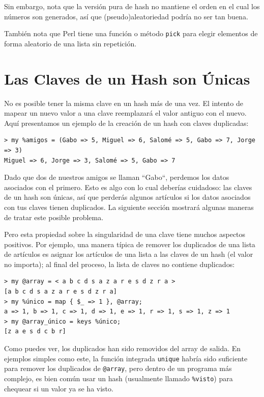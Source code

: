 Sin embargo, nota que la versión pura de hash no mantiene el orden
en el cual los números son generados, así que (pseudo)aleatoriedad
podría no ser tan buena.

También nota que Perl tiene una función o método {\tt pick}
para elegir elementos de forma aleatorio de una lista sin 
repetición.


\section{Las Claves de un Hash son Únicas}

No es posible tener la misma clave en un hash más de una vez.
El intento de mapear un nuevo valor a una clave reemplazará el
valor antiguo con el nuevo. Aquí presentamos un ejemplo de la
creación de un hash con claves duplicadas:

\begin{verbatim}
> my %amigos = (Gabo => 5, Miguel => 6, Salomé => 5, Gabo => 7, Jorge => 3)
Miguel => 6, Jorge => 3, Salomé => 5, Gabo => 7
\end{verbatim}

Dado que dos de nuestros amigos se llaman ``Gabo``,  perdemos los
datos asociados con el primero. Esto es algo con lo cual deberías
cuidadoso: las claves de un hash son únicas, así que perderás algunos
artículos si los datos asociados con tus claves tienen duplicados. 
La siguiente sección mostrará algunas maneras de tratar este posible 
problema.

Pero esta propiedad sobre la singularidad de una clave tiene muchos
aspectos positivos. Por ejemplo, una manera típica de remover los duplicados
de una lista de artículos es asignar los artículos de una lista a las
claves de un hash (el valor no importa); al final del proceso, 
la lista de claves no contiene duplicados:

\begin{verbatim}
> my @array = < a b c d s a z a r e s d z r a >
[a b c d s a z a r e s d z r a]
> my %único = map { $_ => 1 }, @array;
a => 1, b => 1, c => 1, d => 1, e => 1, r => 1, s => 1, z => 1
> my @array_único = keys %único;
[z a e s d c b r]
\end{verbatim}

Como puedes ver, los duplicados han sido removidos del 
array de salida. En ejemplos simples como este, la función
integrada {\tt unique} habría sido suficiente para remover los
duplicados de \verb|@array|, pero dentro de un programa más
complejo, es bien común usar un hash (usualmente llamado \verb|%visto|)
para chequear si un valor ya se ha visto.

